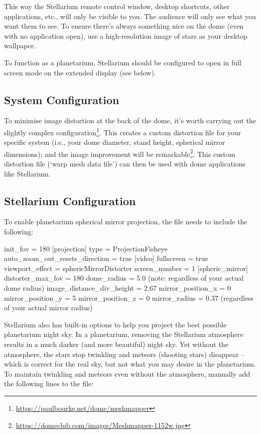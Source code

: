 This way the Stellarium remote control window, desktop shortcuts, other applications, etc., will only be visible
to you. The audience will only see what you want them to see. To ensure there’s always something nice on
the dome (even with no application open), use a high-resolution image of stars as your desktop wallpaper.

To function as a planetarium, Stellarium should be configured to open in full screen mode on the extended
display (see below).

\subsection{System Configuration}
To minimise image distortion at the back of the dome, it’s worth carrying out the slightly complex
 configuration\footnote{\url{https://paulbourke.net/dome/meshmapper}}. 
This creates a custom distortion file for your specific system (i.e., your dome
diameter, stand height, spherical mirror dimensions); 
and the image improvement will be remarkable\footnote{\url{https://domeclub.com/images/Meshmapper-1152w.jpg}}. 
This custom distortion file (‘warp mesh data file’) can then be used with dome applications like Stellarium.

\subsection{Stellarium Configuration}
To enable planetarium spherical mirror projection, the  file needs to include the following:

\begin{configfile}
[navigation]
init_fov = 180
[projection]
type = ProjectionFisheye
auto_zoom_out_resets_direction = true
[video]
fullscreen = true
viewport_effect = sphericMirrorDistorter
screen_number = 1
[spheric_mirror]
distorter_max_fov = 180
dome_radius = 5.0 (note: regardless of your actual dome radius)
image_distance_div_height = 2.67
mirror_position_x = 0
mirror_position_y = 5
mirror_position_z = 0
mirror_radius = 0.37 (regardless of your actual mirror radius)
\end{configfile}

Stellarium also has built-in options to help you project the best possible planetarium night sky.
In a planetarium, removing the Stellarium atmosphere results in a much darker (and more beautiful) night sky.
Yet without the atmosphere, the stars stop twinkling and meteors (shooting stars) disappear -- which is correct
for the real sky, but not what you may desire in the planetarium. To maintain twinkling and meteors even without
the atmosphere, manually add the following lines to the  file:

